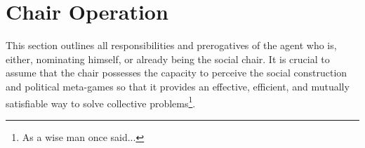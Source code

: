 



\clearpage

\section{Chair Operation}

This section outlines all responsibilities and prerogatives of the agent who is, either, nominating himself, or already being the social chair. It is crucial to assume that the chair possesses the capacity to perceive the social construction and political meta-games so that it provides an effective, efficient, and mutually satisfiable way to solve collective problems\footnote {As a wise man once said...}.


